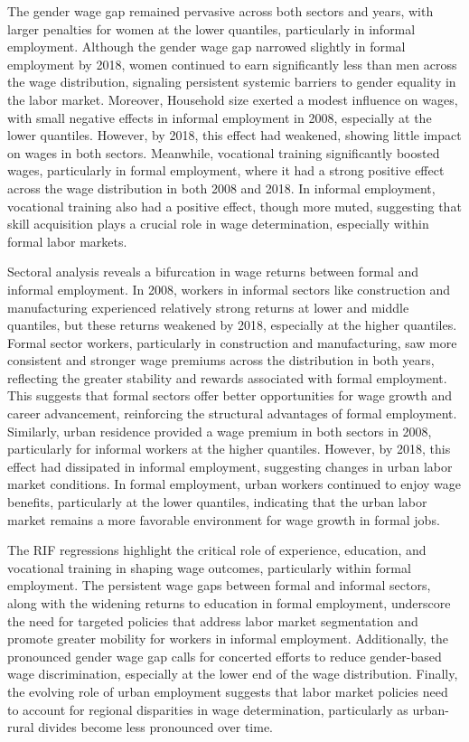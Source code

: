 The gender wage gap remained pervasive across both sectors and years, with larger penalties for women at the lower quantiles, particularly in informal employment. Although the gender wage gap narrowed slightly in formal employment by 2018, women continued to earn significantly less than men across the wage distribution, signaling persistent systemic barriers to gender equality in the labor market. Moreover, Household size exerted a modest influence on wages, with small negative effects in informal employment in 2008, especially at the lower quantiles. However, by 2018, this effect had weakened, showing little impact on wages in both sectors. Meanwhile, vocational training significantly boosted wages, particularly in formal employment, where it had a strong positive effect across the wage distribution in both 2008 and 2018. In informal employment, vocational training also had a positive effect, though more muted, suggesting that skill acquisition plays a crucial role in wage determination, especially within formal labor markets.

Sectoral analysis reveals a bifurcation in wage returns between formal and informal employment. In 2008, workers in informal sectors like construction and manufacturing experienced relatively strong returns at lower and middle quantiles, but these returns weakened by 2018, especially at the higher quantiles. Formal sector workers, particularly in construction and manufacturing, saw more consistent and stronger wage premiums across the distribution in both years, reflecting the greater stability and rewards associated with formal employment. This suggests that formal sectors offer better opportunities for wage growth and career advancement, reinforcing the structural advantages of formal employment. Similarly, urban residence provided a wage premium in both sectors in 2008, particularly for informal workers at the higher quantiles. However, by 2018, this effect had dissipated in informal employment, suggesting changes in urban labor market conditions. In formal employment, urban workers continued to enjoy wage benefits, particularly at the lower quantiles, indicating that the urban labor market remains a more favorable environment for wage growth in formal jobs.

The RIF regressions highlight the critical role of experience, education, and vocational training in shaping wage outcomes, particularly within formal employment. The persistent wage gaps between formal and informal sectors, along with the widening returns to education in formal employment, underscore the need for targeted policies that address labor market segmentation and promote greater mobility for workers in informal employment. Additionally, the pronounced gender wage gap calls for concerted efforts to reduce gender-based wage discrimination, especially at the lower end of the wage distribution. Finally, the evolving role of urban employment suggests that labor market policies need to account for regional disparities in wage determination, particularly as urban-rural divides become less pronounced over time.

